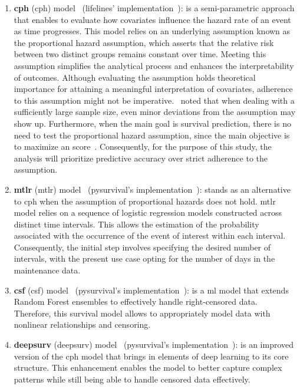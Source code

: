 \begin{enumerate}
\item \textbf{\acl{cph}} (\acs{cph}) model~\cite{Cox1972} (lifelines' implementation~\cite{Lifelines2021}): is a semi-parametric approach that enables to evaluate how covariates influence the hazard rate of an event as time progresses. This model relies on an underlying assumption known as the proportional hazard assumption, which asserts that the relative risk between two distinct groups remains constant over time. Meeting this assumption simplifies the analytical process and enhances the interpretability of outcomes. Although evaluating the assumption holds theoretical importance for attaining a meaningful interpretation of covariates, adherence to this assumption might not be imperative.~\cite{Stensrud2020} noted that when dealing with a sufficiently large sample size, even minor deviations from the assumption may show up. Furthermore, when the main goal is survival prediction, there is no need to test the proportional hazard assumption, since the main objective is to maximize an score~\cite{lifelines_ph_assumption}. Consequently, for the purpose of this study, the analysis will prioritize predictive accuracy over strict adherence to the assumption.

\item \textbf{\acl{mtlr}} (\acs{mtlr}) model~\cite{Yu2021} (pysurvival's implementation~\cite{pysurvival}): stands as an alternative to \ac{cph} when the assumption of proportional hazards does not hold. \ac{mtlr} model relies on a sequence of logistic regression models constructed across distinct time intervals. This allows the estimation of the probability associated with the occurrence of the event of interest within each interval. Consequently, the initial step involves specifying the desired number of intervals, with the present use case opting for the number of days in the maintenance data.

\item \textbf{\acl{csf}} (\acs{csf}) model~\cite{Wright2017} (pysurvival's implementation~\cite{pysurvival}): is a \ac{ml} model that extends Random Forest ensembles to effectively handle right-censored data. Therefore, this survival model allows to appropriately model data with nonlinear relationships and censoring.

\item \textbf{\acl{deepsurv}} (\acs{deepsurv}) model~\cite{Katzman2018} (pysurvival's implementation~\cite{pysurvival}): is an improved version of the \ac{cph} model that brings in elements of deep learning to its core structure. This enhancement enables the model to better capture complex patterns while still being able to handle censored data effectively.
\end{enumerate}

